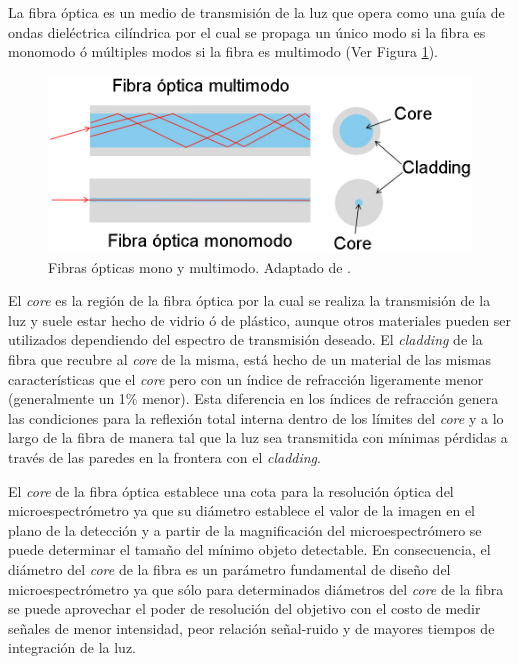 La fibra óptica es un medio de transmisión de la luz que opera como una guía de ondas dieléctrica cilíndrica por el cual se propaga un único modo si la fibra es monomodo ó múltiples modos si la fibra es multimodo (Ver Figura \ref{fig:guiasmon}). 
\begin{figure}[H]
	\centering
	\includegraphics[width=1.0\textwidth]{Figs/introduccion/guias.png}
	\caption{Fibras ópticas mono y multimodo. Adaptado de \cite{dintek}.}
	\label{fig:guiasmon}
\end{figure}
El \textit{core} es la región de la fibra óptica por la cual se realiza la transmisión de la luz y suele estar hecho de vidrio ó de plástico, aunque otros materiales pueden ser utilizados dependiendo del espectro de transmisión deseado. El \textit{cladding} de la fibra que recubre al \textit{core} de la misma, está hecho de un material de las mismas características que el \textit{core} pero con un índice de refracción ligeramente menor (generalmente un 1\% menor)\cite{hecht2012optics}. Esta diferencia en los índices de refracción genera las condiciones para la reflexión total interna dentro de los límites del \textit{core} y a lo largo de la fibra de manera tal que la luz sea transmitida con mínimas pérdidas a través de las paredes en la frontera con el \textit{cladding}. 

El \textit{core} de la fibra óptica establece una cota para la resolución óptica del microespectrómetro ya que su diámetro establece el valor de la imagen en el plano de la detección y a partir de la magnificación del microespectrómero se puede determinar el tamaño del mínimo objeto detectable. En consecuencia, el diámetro del \textit{core} de la fibra es un parámetro fundamental de diseño del microespectrómetro ya que sólo para determinados diámetros del \textit{core} de la fibra se puede aprovechar el poder de resolución del objetivo con el costo de medir señales de menor intensidad, peor relación señal-ruido y de mayores tiempos de integración de la luz.


